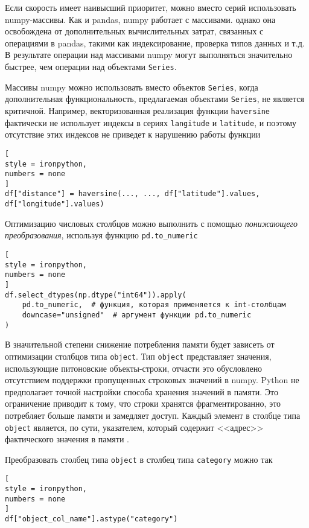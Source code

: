 \documentclass[%
	11pt,
	a4paper,
	utf8,
		]{article}
\begin{document}
Если скорость имеет наивысший приоритет, можно вместо серий использовать numpy-массивы. Как и pandas, numpy работает с массивами. однако она освобождена от дополнительных вычислительных затрат, связанных с операциями в pandas, такими как индексирование, проверка типов данных и т.д. В результате операции над массивами numpy могут выполняться значительно быстрее, чем операции над объектами \texttt{Series}.

Массивы numpy можно использовать вместо объектов \texttt{Series}, когда дополнительная функциональность, предлагаемая объектами \texttt{Series}, не является критичной. Например, векторизованная реализация функции \texttt{haversine} фактически не использует индексы в сериях \texttt{langitude} и \texttt{latitude}, и поэтому отсутствие этих индексов не приведет к нарушению работы функции
\begin{lstlisting}[
style = ironpython,
numbers = none
]
df["distance"] = haversine(..., ..., df["latitude"].values, df["longitude"].values)
\end{lstlisting}

Оптимизацию числовых столбцов можно выполнить с помощью \emph{понижающего преобразования}, используя функцию \texttt{pd.to\_numeric}
\begin{lstlisting}[
style = ironpython,
numbers = none
]
df.select_dtypes(np.dtype("int64")).apply(
    pd.to_numeric,  # функция, которая применяется к int-столбцам
    downcase="unsigned"  # аргумент функции pd.to_numeric
)
\end{lstlisting}

В значительной степени снижение потребления памяти будет зависеть от оптимизации столбцов типа \texttt{object}. Тип \texttt{object} представляет значения, использующие питоновские объекты-строки, отчасти это обусловлено отсутствием поддержки пропущенных строковых значений в numpy. Python не предполагает точной настройки способа хранения значений в памяти. Это ограничение приводит к тому, что строки хранятся фрагментированно, это потребляет больше памяти и замедляет доступ. Каждый элемент в столбце типа \texttt{object} является, по сути, указателем, который содержит <<адрес>> фактического значения в памяти \cite[]{heydt:pandas-2019}.

Преобразовать столбец типа \texttt{object} в столбец типа \texttt{category} можно так
\begin{lstlisting}[
style = ironpython,
numbers = none
]
df["object_col_name"].astype("category")
\end{lstlisting}
\end{document}
